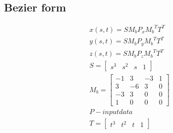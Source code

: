 \documentclass{article}
\begin{document}
\subsection{Bezier form}

\begin{gather}
	x(s, t) = S M_b P_x {M_b}^T T^T\\
	y(s, t) = S M_b P_y {M_b}^T T^T\\
	z(s, t) = S M_b P_z {M_b}^T T^T\\
	S = \begin{bmatrix}
		s^3 & s^2 & s & 1
	\end{bmatrix}
	\\
	M_b = \begin{bmatrix}
		-1 &  3 & -3 & 1\\
		 3 & -6 &  3 & 0\\
		-3 &  3 &  0 & 0\\
		 1 &  0 &  0 & 0
	\end{bmatrix}
	\\
	P - input data\\
	T = \begin{bmatrix}
		t^3 & t^2 & t & 1
	\end{bmatrix}
\end{gather}
\end{document}
